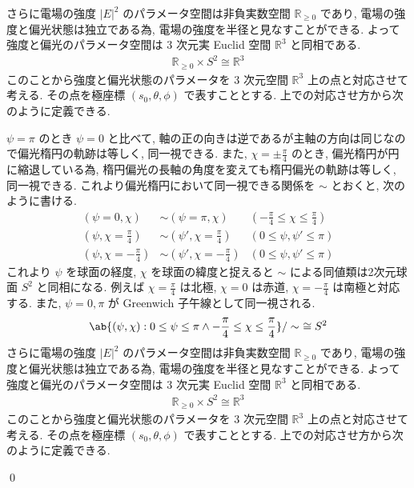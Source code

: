 \documentclass[uplatex,dvipdfmx,a4paper,11pt]{jlreq}
\makeatletter
\newcommand{\RR}{\mathbb{R}}
\theoremstyle{definition}
\renewenvironment{proof}[1][\proofname]{\par
  \normalfont
  \topsep6\p@\@plus6\p@ \trivlist
  \item[\hskip\labelsep{\bfseries #1}\@addpunct{\bfseries}]\ignorespaces\quad\par
}{%
  \qed\endtrivlist\@endpefalse
}
\renewcommand\proofname{証明}
\makeatother
\begin{document}
\begin{proposition}
  さらに電場の強度 $|E|^2$ のパラメータ空間は非負実数空間 $\RR_{\geq0}$ であり, 電場の強度と偏光状態は独立である為, 電場の強度を半径と見なすことができる. よって強度と偏光のパラメータ空間は 3 次元実 Euclid 空間 $\RR^3$ と同相である.
  \begin{align}
    \RR_{\geq 0}\times S^2 \cong \RR^3
  \end{align}
  このことから強度と偏光状態のパラメータを 3 次元空間 $\RR^3$ 上の点と対応させて考える. その点を極座標 $(s_0, \theta, \phi)$ で表すこととする. 上での対応させ方から次のように定義できる.
\end{proposition}
\begin{proof}
  $\psi = \pi$ のとき $\psi = 0$ と比べて, 軸の正の向きは逆であるが主軸の方向は同じなので偏光楕円の軌跡は等しく, 同一視できる. また, $\chi = \pm\frac{\pi}{4}$ のとき, 偏光楕円が円に縮退している為, 楕円偏光の長軸の角度を変えても楕円偏光の軌跡は等しく, 同一視できる. これより偏光楕円において同一視できる関係を $\sim$ とおくと, 次のように書ける.
  \begin{align}
    (\psi = 0, \chi)              & \sim (\psi = \pi, \chi)             & (-\frac{\pi}{4}\leq\chi\leq\frac{\pi}{4}) \\
    (\psi, \chi = \frac{\pi}{4})  & \sim (\psi', \chi = \frac{\pi}{4})  & (0\leq\psi,\psi'\leq\pi)                  \\
    (\psi, \chi = -\frac{\pi}{4}) & \sim (\psi', \chi = -\frac{\pi}{4}) & (0\leq\psi,\psi'\leq\pi)
  \end{align}
  これより $\psi$ を球面の経度, $\chi$ を球面の緯度と捉えると $\sim$ による同値類は2次元球面 $S^2$ と同相になる. 例えば $\chi = \frac{\pi}{4}$ は北極, $\chi = 0$ は赤道, $\chi = -\frac{\pi}{4}$ は南極と対応する. また, $\psi = 0,\pi$ が Greenwich 子午線として同一視される.
  \begin{align}
    \ab\{(\psi, \chi):0\leq\psi\leq\pi \land -\frac{\pi}{4}\leq\chi\leq\frac{\pi}{4}\}/\sim\ \cong S^2
  \end{align}
  さらに電場の強度 $|E|^2$ のパラメータ空間は非負実数空間 $\RR_{\geq0}$ であり, 電場の強度と偏光状態は独立である為, 電場の強度を半径と見なすことができる. よって強度と偏光のパラメータ空間は 3 次元実 Euclid 空間 $\RR^3$ と同相である.
  \begin{align}
    \RR_{\geq 0}\times S^2 \cong \RR^3
  \end{align}
  このことから強度と偏光状態のパラメータを 3 次元空間 $\RR^3$ 上の点と対応させて考える. その点を極座標 $(s_0, \theta, \phi)$ で表すこととする. 上での対応させ方から次のように定義できる.

\end{proof}
\end{document}
